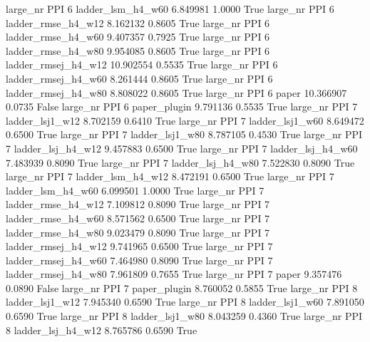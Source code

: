   large_nr      PPI                 6   ladder_lsm_h4_w60    6.849981      1.0000    True
  large_nr      PPI                 6  ladder_rmse_h4_w12    8.162132      0.8605    True
  large_nr      PPI                 6  ladder_rmse_h4_w60    9.407357      0.7925    True
  large_nr      PPI                 6  ladder_rmse_h4_w80    9.954085      0.8605    True
  large_nr      PPI                 6 ladder_rmsej_h4_w12   10.902554      0.5535    True
  large_nr      PPI                 6 ladder_rmsej_h4_w60    8.261444      0.8605    True
  large_nr      PPI                 6 ladder_rmsej_h4_w80    8.808022      0.8605    True
  large_nr      PPI                 6               paper   10.366907      0.0735   False
  large_nr      PPI                 6        paper_plugin    9.791136      0.5535    True
  large_nr      PPI                 7     ladder_lsj1_w12    8.702159      0.6410    True
  large_nr      PPI                 7     ladder_lsj1_w60    8.649472      0.6500    True
  large_nr      PPI                 7     ladder_lsj1_w80    8.787105      0.4530    True
  large_nr      PPI                 7   ladder_lsj_h4_w12    9.457883      0.6500    True
  large_nr      PPI                 7   ladder_lsj_h4_w60    7.483939      0.8090    True
  large_nr      PPI                 7   ladder_lsj_h4_w80    7.522830      0.8090    True
  large_nr      PPI                 7   ladder_lsm_h4_w12    8.472191      0.6500    True
  large_nr      PPI                 7   ladder_lsm_h4_w60    6.099501      1.0000    True
  large_nr      PPI                 7  ladder_rmse_h4_w12    7.109812      0.8090    True
  large_nr      PPI                 7  ladder_rmse_h4_w60    8.571562      0.6500    True
  large_nr      PPI                 7  ladder_rmse_h4_w80    9.023479      0.8090    True
  large_nr      PPI                 7 ladder_rmsej_h4_w12    9.741965      0.6500    True
  large_nr      PPI                 7 ladder_rmsej_h4_w60    7.464980      0.8090    True
  large_nr      PPI                 7 ladder_rmsej_h4_w80    7.961809      0.7655    True
  large_nr      PPI                 7               paper    9.357476      0.0890   False
  large_nr      PPI                 7        paper_plugin    8.760052      0.5855    True
  large_nr      PPI                 8     ladder_lsj1_w12    7.945340      0.6590    True
  large_nr      PPI                 8     ladder_lsj1_w60    7.891050      0.6590    True
  large_nr      PPI                 8     ladder_lsj1_w80    8.043259      0.4360    True
  large_nr      PPI                 8   ladder_lsj_h4_w12    8.765786      0.6590    True
